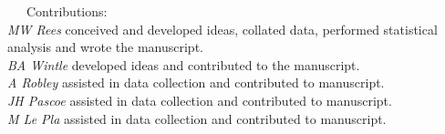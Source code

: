 \documentclass[11pt,a4paper,titlepage,twoside,openright]{style/unimelbthesis}
\begin{document}
\begin{frontmatter}
\begin{preface}
    ~~~Contributions:\\
    \hspace*{0.333em}\hspace*{0.333em}\hspace*{0.333em}\hspace*{0.333em}\hspace*{0.333em}\hspace*{0.333em}\hspace*{0.333em}\hspace*{0.333em}\emph{MW Rees} conceived and developed ideas, collated data, performed statistical analysis and wrote the manuscript.\\
    \hspace*{0.333em}\hspace*{0.333em}\hspace*{0.333em}\hspace*{0.333em}\hspace*{0.333em}\hspace*{0.333em}\hspace*{0.333em}\hspace*{0.333em}\emph{BA Wintle} developed ideas and contributed to the manuscript.\\
    \hspace*{0.333em}\hspace*{0.333em}\hspace*{0.333em}\hspace*{0.333em}\hspace*{0.333em}\hspace*{0.333em}\hspace*{0.333em}\hspace*{0.333em}\emph{A Robley} assisted in data collection and contributed to manuscript.\\
    \hspace*{0.333em}\hspace*{0.333em}\hspace*{0.333em}\hspace*{0.333em}\hspace*{0.333em}\hspace*{0.333em}\hspace*{0.333em}\hspace*{0.333em}\emph{JH Pascoe} assisted in data collection and contributed to manuscript.\\
    \hspace*{0.333em}\hspace*{0.333em}\hspace*{0.333em}\hspace*{0.333em}\hspace*{0.333em}\hspace*{0.333em}\hspace*{0.333em}\hspace*{0.333em}\emph{M Le Pla} assisted in data collection and contributed to manuscript.\\

\end{preface}
\end{frontmatter}
\end{document}
